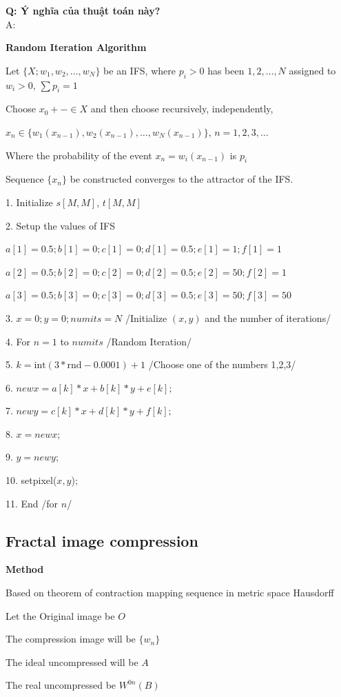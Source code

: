 \textbf{Q: Ý nghĩa của thuật toán này?}\\
A: 


\textbf{Random Iteration Algorithm}

Let $\{X; w_1, w_2, \ldots, w_N\}$ be an IFS, where $p_i > 0$ has been $1, 2, \ldots, N$ assigned to $w_i > 0$, $\sum p_i = 1$

Choose $x_0+- \in X$ and then choose recursively, independently,

$x_n \in \{ w_1(x_{n-1}), w_2(x_{n-1}), \ldots, w_N(x_{n-1}) \}$, $n = 1, 2, 3, \ldots$

Where the probability of the event $x_n = w_i(x_{n-1})$ is $p_i$

Sequence $\{x_n\}$ be constructed converges to the attractor of the IFS.

1. Initialize $s[M,M]$, $t[M,M]$

2. Setup the values of IFS

$a[1]=0.5; b[1]=0; c[1]=0; d[1]=0.5; e[1]=1; f[1]=1$

$a[2]=0.5; b[2]=0; c[2]=0; d[2]=0.5; e[2]=50; f[2]=1$

$a[3]=0.5; b[3]=0; c[3]=0; d[3]=0.5; e[3]=50; f[3]=50$

3. $x=0; y=0; numits=N$ /Initialize $(x,y)$ and the number of iterations/

4. For $n=1$ to $numits$ /Random Iteration/

5. $k=\text{int}(3*\text{rnd}-0.0001)+1$ /Choose one of the numbers 1,2,3/

6. $newx=a[k]*x+b[k]*y+e[k];$

7. $newy=c[k]*x+d[k]*y+f[k];$

8. $x= newx;$

9. $y=newy;$

10. setpixel($x,y$);

11. End /for $n$/


\subsection {Fractal image compression}

\textbf{Method}

Based on theorem of contraction mapping sequence in metric space Hausdorff

Let the Original image be $O$

The compression image will be $\{ w_n \}$

The ideal uncompressed will be $A$

The real uncompressed be $W^{0n}(B)$

